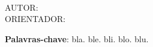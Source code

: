 \begin{resumo}[RESUMO]
\vspace{2em}
\begin{center}
\textbf{\expandafter\MakeUppercase\expandafter{\imprimirtitulo}}\\
\vspace{1em}
AUTOR: \imprimirautor\\
ORIENTADOR: \imprimirorientador
\end{center}
\vspace{1em}
\lipsum[1]

\vspace{2em}
\textbf{Palavras-chave}: bla. ble. bli. blo. blu.
\end{resumo}
